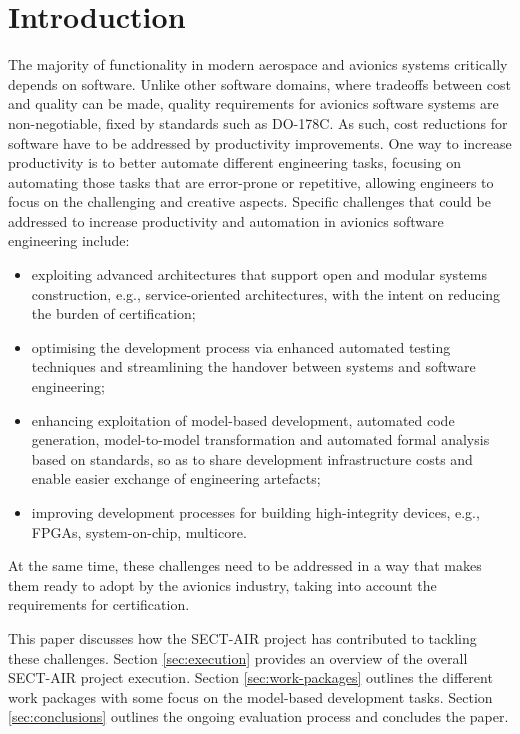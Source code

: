 \section{Introduction}
\label{sec:introduction}

The majority of functionality in modern aerospace and avionics systems critically depends on software. Unlike other software domains, where tradeoffs between cost and quality can be made, quality requirements for avionics software systems are non-negotiable, fixed by standards such as DO-178C. As such, cost reductions for software have to be addressed by productivity improvements. One way to increase productivity is to better automate different engineering tasks, focusing on automating those tasks that are error-prone or repetitive, allowing engineers to focus on the challenging and creative aspects. Specific challenges that could be addressed to increase productivity and automation in avionics software engineering include:
\begin{itemize}
\item exploiting advanced architectures that support open and modular systems construction, e.g., service-oriented architectures, with the intent on reducing the burden of certification;
\item optimising the development process via enhanced automated testing techniques and streamlining the handover between systems and software engineering;
\item enhancing exploitation of model-based development, automated code generation, model-to-model transformation and automated formal analysis based on standards, so as to share development infrastructure costs and enable easier exchange of engineering artefacts;
\item improving development processes for building high-integrity devices, e.g., FPGAs, system-on-chip, multicore.
\end{itemize}
At the same time, these challenges need to be addressed in a way that makes them ready to adopt by the avionics industry, taking into account the requirements for certification.

This paper discusses how the SECT-AIR project has contributed to tackling these challenges. 
Section \ref{sec:execution} provides an overview of the overall SECT-AIR project execution. Section \ref{sec:work-packages} outlines the different work packages with some focus on the model-based development tasks. Section \ref{sec:conclusions} outlines the ongoing evaluation process and concludes the paper.

